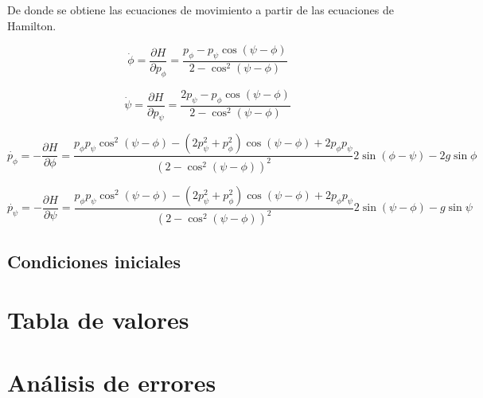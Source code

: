 \documentclass[11pt, twoside]{article} %
\begin{document}
De donde se obtiene las ecuaciones de movimiento a partir de las 
ecuaciones de Hamilton.

\begin{equation}
        \dot{\phi} = \frac{\partial H}{\partial p_\phi} = \frac{p_\phi - p_\psi\cos(\psi - \phi)}{2-\cos^2(\psi - \phi)} 
\end{equation}

\begin{equation}
    \dot{\psi} = \frac{\partial H}{\partial p_\psi} = \frac{2p_\psi - p_\phi\cos(\psi - \phi)}{2-\cos^2(\psi - \phi)}
\end{equation}

\begin{equation}
    \dot{p_\phi} = -\frac{\partial H}{\partial \phi} =  \frac{p_\phi p_\psi \cos^2(\psi - \phi) - (2p_\psi^2 + p_\phi^2)\cos(\psi - \phi) + 2p_\phi p_\psi }{(2-\cos^2(\psi - \phi))^2}2\sin(\phi - \psi) -2g\sin\phi
\end{equation}

\begin{equation}
    \dot{p_\psi} = -\frac{\partial H}{\partial \psi} =  \frac{p_\phi p_\psi \cos^2(\psi - \phi) - (2p_\psi^2 + p_\phi^2)\cos(\psi - \phi) + 2p_\phi p_\psi }{(2-\cos^2(\psi - \phi))^2}2\sin(\psi - \phi) -g\sin\psi
\end{equation}

\subsection{Condiciones iniciales}



\newpage

\appendix

\section{Tabla de valores}


\newpage

\section{Análisis de errores}
\end{document}
